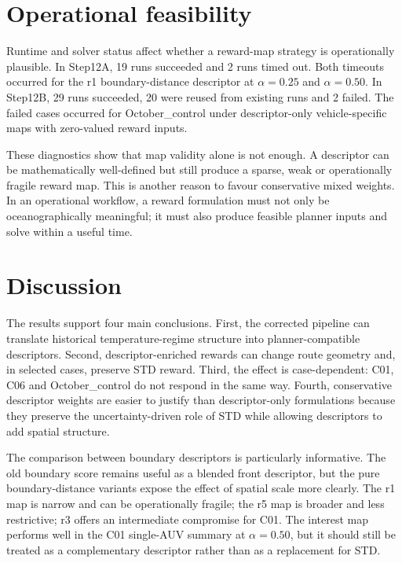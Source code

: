 \section{Operational feasibility}

Runtime and solver status affect whether a reward-map strategy is operationally plausible. In Step12A, 19 runs succeeded and 2 runs timed out. Both timeouts occurred for the r1 boundary-distance descriptor at $\alpha=0.25$ and $\alpha=0.50$. In Step12B, 29 runs succeeded, 20 were reused from existing runs and 2 failed. The failed cases occurred for October\_control under descriptor-only vehicle-specific maps with zero-valued reward inputs.

These diagnostics show that map validity alone is not enough. A descriptor can be mathematically well-defined but still produce a sparse, weak or operationally fragile reward map. This is another reason to favour conservative mixed weights. In an operational workflow, a reward formulation must not only be oceanographically meaningful; it must also produce feasible planner inputs and solve within a useful time.

\section{Discussion}

The results support four main conclusions. First, the corrected pipeline can translate historical temperature-regime structure into planner-compatible descriptors. Second, descriptor-enriched rewards can change route geometry and, in selected cases, preserve STD reward. Third, the effect is case-dependent: C01, C06 and October\_control do not respond in the same way. Fourth, conservative descriptor weights are easier to justify than descriptor-only formulations because they preserve the uncertainty-driven role of STD while allowing descriptors to add spatial structure.

The comparison between boundary descriptors is particularly informative. The old boundary score remains useful as a blended front descriptor, but the pure boundary-distance variants expose the effect of spatial scale more clearly. The r1 map is narrow and can be operationally fragile; the r5 map is broader and less restrictive; r3 offers an intermediate compromise for C01. The interest map performs well in the C01 single-AUV summary at $\alpha=0.50$, but it should still be treated as a complementary descriptor rather than as a replacement for STD.

